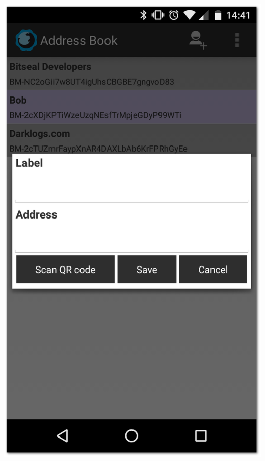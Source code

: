 \documentclass{bfh}
\begin{document}
\begin{center}
\begin{minipage}{.3\linewidth}
      \includegraphics[width=1.0 \textwidth]{images/screenshots/bitseal_contacts_add.png}
    \end{minipage}
  \end{center}
\end{document}
